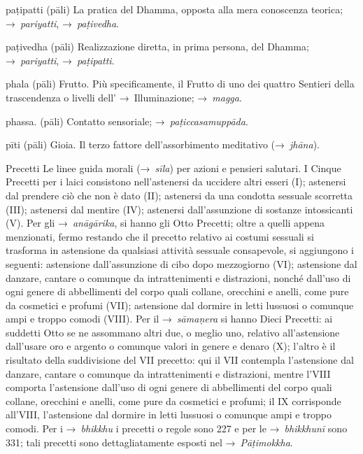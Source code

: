\begin{glossarydescription}
\item[paṭipatti] (pāli) La pratica del Dhamma, opposta alla mera conoscenza
  teorica; →~\emph{pariyatti}, →~\emph{paṭivedha}.

\item[paṭivedha] (pāli) Realizzazione diretta, in prima persona, del Dhamma;
  →~\emph{pariyatti}, →~\emph{paṭipatti}.

\item[phala] (pāli) Frutto. Più specificamente, il Frutto di uno dei quattro
  Sentieri della trascendenza o livelli dell' →~Illuminazione; →~\emph{magga}.

\item[phassa.] (pāli) Contatto sensoriale; →~\emph{paṭiccasamuppāda}.

\item[pīti] (pāli) Gioia. Il terzo fattore dell'assorbimento meditativo
  (→~\emph{jhāna}).

\item[Precetti] \label{glossary-precetti} Le linee guida morali (→~\emph{sīla}) per azioni e pensieri
  salutari. I Cinque Precetti per i laici consistono nell'astenersi da uccidere
  altri esseri (I); astenersi dal prendere ciò che non è dato (II); astenersi da
  una condotta sessuale scorretta (III); astenersi dal mentire (IV); astenersi
  dall'assunzione di sostanze intossicanti (V). Per gli →~\emph{anāgārika}, si
  hanno gli Otto Precetti; oltre a quelli appena menzionati, fermo restando che
  il precetto relativo ai costumi sessuali si trasforma in astensione da
  qualsiasi attività sessuale consapevole, si aggiungono i seguenti: astensione
  dall'assunzione di cibo dopo mezzogiorno (VI); astensione dal danzare, cantare
  o comunque da intrattenimenti e distrazioni, nonché dall'uso di ogni genere di
  abbellimenti del corpo quali collane, orecchini e anelli, come pure da
  cosmetici e profumi (VII); astensione dal dormire in letti lussuosi o comunque
  ampi e troppo comodi (VIII). Per il →~\emph{sāmaṇera} si hanno Dieci Precetti:
  ai suddetti Otto se ne assommano altri due, o meglio uno, relativo
  all'astensione dall'usare oro e argento o comunque valori in genere e denaro
  (X); l'altro è il risultato della suddivisione del VII precetto: qui il VII
  contempla l'astensione dal danzare, cantare o comunque da intrattenimenti e
  distrazioni, mentre l'VIII comporta l'astensione dall'uso di ogni genere di
  abbellimenti del corpo quali collane, orecchini e anelli, come pure da
  cosmetici e profumi; il IX corrisponde all'VIII, l'astensione dal dormire in
  letti lussuosi o comunque ampi e troppo comodi. Per i →~\emph{bhikkhu} i
  precetti o regole sono 227 e per le →~\emph{bhikkhunī} sono 331; tali precetti
  sono dettagliatamente esposti nel →~\emph{Pāṭimokkha}.


\end{glossarydescription}
